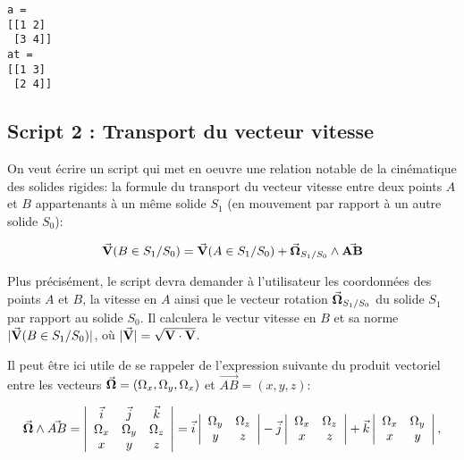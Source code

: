 \documentclass{article}
\begin{document}
    \begin{Verbatim}[commandchars=\\\{\}]
a = 
[[1 2]
 [3 4]]
at = 
[[1 3]
 [2 4]]
    \end{Verbatim}

    \subsection{Script 2 : Transport du vecteur
vitesse}\label{script-2-transport-du-vecteur-vitesse}

    On veut écrire un script qui met en oeuvre une relation notable de la
cinématique des solides rigides: la formule du transport du vecteur
vitesse entre deux points \(A\) et \(B\) appartenants à un même solide
\(S_1\) (en mouvement par rapport à un autre solide \(S_0\)):

    \[\vec{\bf V}(B \in S_1/S_0) = \vec{\bf V}(A \in S_1/S_0) + \vec{\bf \Omega}_{S_1/S_0} \wedge \vec{\bf AB}\]

    Plus précisément, le script devra demander à l'utilisateur les
coordonnées des points \(A\) et \(B\), la vitesse en \(A\) ainsi que le
vecteur rotation \(\vec{\bf \Omega}_{S_1/S_0}\) du solide \(S_1\) par
rapport au solide \(S_0\). Il calculera le vectur vitesse en \(B\) et sa
norme \(|\vec{\bf V}(B \in S_1/S_0)|\), où
\(|\vec{\bf V}|=\sqrt{{\bf V}\cdot{\bf V}}\).

    Il peut être ici utile de se rappeler de l'expression suivante du
produit vectoriel entre les vecteurs
\(\vec{\bf{\Omega}}=(\Omega_x,\Omega_y,\Omega_x)\) et
\(\vec{AB}=(x,y,z)\):

\[
\vec{\bf{\Omega}} \wedge \vec{AB}=
\left| \begin{array}{ccc}
\vec{i} & \vec{j} & \vec{k}  \\
\Omega_x & \Omega_y & \Omega_z \\
x & y & z
\end{array} \right| = 
\vec{i} \left| \begin{array}{cc}
\Omega_y & \Omega_z \\
y & z
\end{array}
\right| - 
\vec{j} \left| \begin{array}{cc}
\Omega_x & \Omega_z \\
x & z
\end{array}
\right| + 
\vec{k} \left| \begin{array}{cc}
\Omega_x & \Omega_y \\
x & y
\end{array}
\right|,
\]
\end{document}
